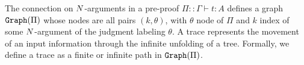 %
%
%
%
%




The connection on ${N}$-arguments in a pre-proof $\Pi::\Gamma\vdash t:A$ defines a 
graph ${\tt Graph}(\Pi)$ whose nodes are all pairs $(k,\theta)$, with $\theta$ node of $\Pi$ and 
$k$ index of some ${N}$-argument of  the judgment labeling $\theta$. 
A trace represents the movement of an input information through the 
infinite unfolding of a tree. Formally, we define a trace as a finite or infinite path 
in ${\tt Graph}(\Pi)$.

